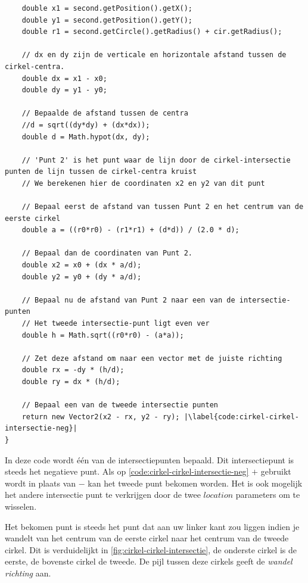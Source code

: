 \documentclass[12pt,a4paper,oneside]{book}
\begin{document}
{\begin{lstlisting}
	double x1 = second.getPosition().getX();
	double y1 = second.getPosition().getY();
	double r1 = second.getCircle().getRadius() + cir.getRadius();

	// dx en dy zijn de verticale en horizontale afstand tussen de cirkel-centra.
	double dx = x1 - x0;
	double dy = y1 - y0;

	// Bepaalde de afstand tussen de centra
	//d = sqrt((dy*dy) + (dx*dx));
	double d = Math.hypot(dx, dy);

	// 'Punt 2' is het punt waar de lijn door de cirkel-intersectie punten de lijn tussen de cirkel-centra kruist
	// We berekenen hier de coordinaten x2 en y2 van dit punt

	// Bepaal eerst de afstand van tussen Punt 2 en het centrum van de eerste cirkel
	double a = ((r0*r0) - (r1*r1) + (d*d)) / (2.0 * d);

	// Bepaal dan de coordinaten van Punt 2.
	double x2 = x0 + (dx * a/d);
	double y2 = y0 + (dy * a/d);

	// Bepaal nu de afstand van Punt 2 naar een van de intersectie-punten
	// Het tweede intersectie-punt ligt even ver
	double h = Math.sqrt((r0*r0) - (a*a));

	// Zet deze afstand om naar een vector met de juiste richting
	double rx = -dy * (h/d);
	double ry = dx * (h/d);

	// Bepaal een van de tweede intersectie punten
	return new Vector2(x2 - rx, y2 - ry); |\label{code:cirkel-cirkel-intersectie-neg}|
}
\end{lstlisting}

In deze code wordt één van de intersectiepunten bepaald.
Dit intersectiepunt is steeds het negatieve punt. %
Als op \autoref{code:cirkel-cirkel-intersectie-neg} $+$ gebruikt wordt in plaats van $-$ kan het tweede punt bekomen worden.
Het is ook mogelijk het andere intersectie punt te verkrijgen door de twee $location$ parameters om te wisselen.

Het bekomen punt is steeds het punt dat aan uw linker kant zou liggen indien je wandelt van het centrum van de eerste cirkel naar het centrum van de tweede cirkel.
Dit is verduidelijkt in \autoref{fig:cirkel-cirkel-intersectie}, de onderste cirkel is de eerste, de bovenste cirkel de tweede.
De pijl tussen deze cirkels geeft de \textit{wandel richting} aan.

}
\end{document}
